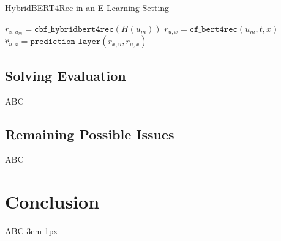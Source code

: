\documentclass{Academic}
\begin{document}
    \begin{algorithm}[ht!]
        \caption{HybridBERT4Rec in an E-Learning Setting}
        \begin{algorithmic}[1]
                \State $r_{x,u_m} = \texttt{cbf\_hybridbert4rec}(H(u_m))$
                    \State $r_{u, x} = \texttt{cf\_bert4rec}(u_m,t,x)$
                    \State $\hat{r}_{u,x} = \texttt{prediction\_layer}(r_{x,u}, r_{u,x})$
                \EndFor
            \EndFor
        \end{algorithmic}
    \end{algorithm}

    \FloatBarrier
    \subsection{Solving Evaluation}
    ABC
    \subsection{Remaining Possible Issues}
    ABC
    \section{Conclusion}
    ABC
    \singlespacing
    \emergencystretch 3em
    \hfuzz 1px
    \printbibliography[heading=bibnumbered]




\end{document}
